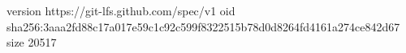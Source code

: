 version https://git-lfs.github.com/spec/v1
oid sha256:3aaa2fd88c17a017e59c1c92c599f8322515b78d0d8264fd4161a274ce842d67
size 20517
